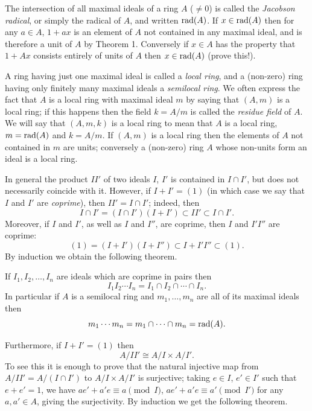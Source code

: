 The intersection of all maximal ideals of a ring $A$ ($\neq 0$) is called the
\emph{Jacobson radical}, or simply the radical of $A$, and written $\operatorname{rad}(A)$. If
$x \in \operatorname{rad}(A)$ then for any $a \in A$, $1 + ax$ is an element of $A$ not contained in
any maximal ideal, and is therefore a unit of $A$ by Theorem 1. Conversely
if $x \in A$ has the property that $1 + Ax$ consists entirely of units of $A$ then
$x \in \operatorname{rad}(A)$ (prove this!).

A ring having just one maximal ideal is called a \emph{local ring}, and a
(non-zero) ring having only finitely many maximal ideals a \emph{semilocal ring}.
We often express the fact that $A$ is a local ring with maximal ideal $m$ by
saying that $(A, m)$ is a local ring; if this happens then the field $k = A/m$ is
called the \emph{residue field} of $A$. We will say that $(A, m, k)$ is a local ring to
mean that $A$ is a local ring, $m = \operatorname{rad}(A)$ and $k = A/m$. If $(A, m)$ is a local
ring then the elements of $A$ not contained in $m$ are units; conversely a
(non-zero) ring $A$ whose non-units form an ideal is a local ring.

In general the product $II'$ of two ideals $I$, $I'$ is contained in $I \cap I'$, but
does not necessarily coincide with it. However, if $I + I' = (1)$ (in which case
we say that $I$ and $I'$ are \emph{coprime}), then $II' = I \cap I'$; indeed, then
\[
  I \cap I' = (I \cap I')(I + I') \subset II' \subset I \cap I'.
\]
Moreover, if $I$ and $I'$, as well as $I$ and $I''$, are coprime, then $I$ and $I'I''$ are coprime:
\[
  (1) = (I + I')(I + I'') \subset I + I'I'' \subset (1).
\]
By induction we obtain the following theorem.

\begin{theorem}\label{thm:1.3}
If $I_1, I_2, \ldots, I_n$ are ideals which are coprime in pairs then
\[
  I_1I_2 \cdots I_n = I_1 \cap I_2 \cap \cdots \cap I_n.
\]
In particular if $A$ is a semilocal ring and $m_1, \ldots, m_n$ are all of its maximal
ideals then
\[
  m_1 \cdots m_n = m_1 \cap \cdots \cap m_n = \operatorname{rad}(A).
\]
\end{theorem}

Furthermore, if $I + I' = (1)$ then
\[
  A/II' \cong A/I \times A/I'.
\]
To see this it is enough to prove that the natural injective map from $A/II' = A/(I \cap I')$ to
$A/I \times A/I'$ is surjective; taking $e \in I$, $e' \in I'$ such that $e + e' = 1$, we
have $ae' + a'e \equiv a \pmod I$, $ae' + a'e \equiv a' \pmod{I'}$ for any $a, a' \in A$,
giving the surjectivity. By induction we get the following theorem.


